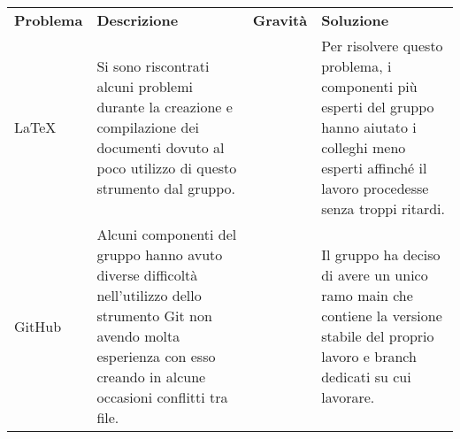 \begin{table}[H]
    \caption{Tabella delle problematiche relative agli strumenti di lavoro}
\renewcommand{\arraystretch}{1.5}
\begin{longtable}{  >{\centering}p{} >{}p{}
    >{\centering}p{} >{}p{}}
    \rowcolor{\primaryColor}
    \textcolor{\secondaryColor}{
    \centering\textbf{Problema}}     & \textcolor{\secondaryColor}{\centering\textbf{Descrizione}}    & \textcolor{\secondaryColor}
    {\centering\textbf{Gravità}} & \textcolor{\secondaryColor}{\centering\textbf{Soluzione}}\\
   
    \LaTeX{} 
    & Si sono riscontrati alcuni problemi durante la creazione e compilazione dei documenti 
    dovuto al poco utilizzo di questo strumento dal gruppo.
    & 1  
    & Per risolvere questo problema, i componenti più esperti del gruppo hanno 
    aiutato i colleghi meno esperti affinché il lavoro procedesse senza troppi ritardi. {} \\
    GitHub
    & Alcuni componenti del gruppo hanno avuto diverse difficoltà nell’utilizzo 
    dello strumento Git non avendo molta esperienza con esso creando in alcune occasioni conflitti tra file. 
    & 2
    & Il gruppo ha deciso di avere un unico ramo main che contiene la versione stabile del proprio 
    lavoro e branch dedicati su cui lavorare. {} \\
    \end{longtable}
\end{table}
